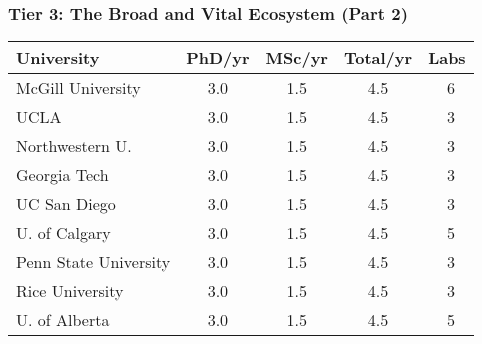 \documentclass[aspectratio=169]{beamer}
\newcommand{\tabletext}{\normalsize}
\begin{document}
\begin{frame}
    \frametitle{Tier 3: The Broad and Vital Ecosystem (Part 2)}
    \subtitle{Medium producers with 4-6 total theses per year}
    
    \begin{table}
        \centering
        \tabletext
        \begin{tabularx}{\textwidth}{
            l
            S[table-format=1.1]
            S[table-format=1.1]
            S[table-format=1.1]
            S[table-format=2.0, table-space-text-pre=~]
        }
            \toprule
            \textbf{University} & {\textbf{PhD/yr}} & {\textbf{MSc/yr}} & {\textbf{Total/yr}} & {\textbf{Labs}} \\
            \midrule
            McGill University & 3.0 & 1.5 & 4.5 & ~6 \\
            UCLA & 3.0 & 1.5 & 4.5 & ~3 \\
            Northwestern U. & 3.0 & 1.5 & 4.5 & ~3 \\
            Georgia Tech & 3.0 & 1.5 & 4.5 & ~3 \\
            UC San Diego & 3.0 & 1.5 & 4.5 & ~3 \\
            U. of Calgary & 3.0 & 1.5 & 4.5 & ~5 \\
            Penn State University & 3.0 & 1.5 & 4.5 & ~3 \\
            Rice University & 3.0 & 1.5 & 4.5 & ~3 \\
            U. of Alberta & 3.0 & 1.5 & 4.5 & ~5 \\
            \bottomrule
        \end{tabularx}
    \end{table}
\end{frame}
\end{document}

